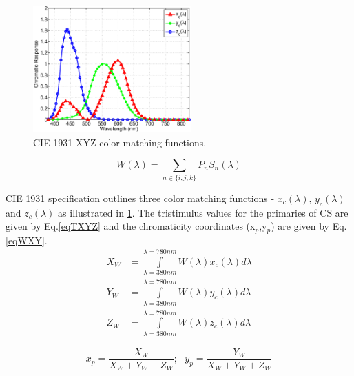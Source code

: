 \documentclass[10pt,letterpaper]{article}
\begin{document}
\begin{figure}[b]
	\centering
		\includegraphics[trim={0.05in 0.05in 0.05in 0.05in}, clip=true, width=2.4in]{CIE1931CMF.eps}
	\caption{CIE 1931 XYZ color matching functions.}
	\label{figCIEXYZ}
\end{figure}

\begin{equation}
	W(\lambda) = \sum\limits_{n\in\{i,j,k\}}P_{n}S_{n}(\lambda)
	\label{eqWLDA}
\end{equation}

CIE 1931 specification outlines three color matching functions - $x_{c}(\lambda)$, $y_{c}(\lambda)$ and $z_{c}(\lambda)$ as illustrated in \figurename\ref{figCIEXYZ}. The tristimulus values for the primaries of CS are given by Eq.\eqref{eqTXYZ} and the chromaticity coordinates (x$_{p}$,y$_{p}$) are given by Eq. \eqref{eqWXY}. 
\begin{equation}
	\begin{aligned}
		X_{W} &= \int\limits_{\lambda=380nm}^{\lambda=780nm}W(\lambda)x_{c}(\lambda)d\lambda\\
		Y_{W} &= \int\limits_{\lambda=380nm}^{\lambda=780nm}W(\lambda)y_{c}(\lambda)d\lambda\\
		Z_{W} &= \int\limits_{\lambda=380nm}^{\lambda=780nm}W(\lambda)z_{c}(\lambda)d\lambda
	\end{aligned}
	\label{eqTXYZ}
\end{equation}

\begin{equation}
	x_{p} = \frac{X_{W}}{X_{W}+Y_{W}+Z_{W}}; \text{  } y_{p} = \frac{Y_{W}}{X_{W}+Y_{W}+Z_{W}} %
	\label{eqWXY}
\end{equation}
\end{document}
